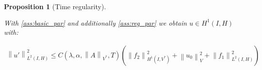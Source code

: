 \documentclass[english,a4paper,9pt,oneside]{scrbook}	%
\theoremstyle{break}
\newtheorem{thm}[equation]{Theorem}
\newtheorem{prop}[equation]{Proposition}
\newenvironment{mproof}[1][\proofname]{%
  \begin{proof}[#1]$ $\par\nobreak\ignorespaces
}{%
  \end{proof}
}
\renewcommand*{\proofname}{Proof}
\theoremstyle{remark}
\newcommand{\norm}[1]{\left\lVert#1\right\rVert}
\newcommand{\HN}[1]{\norm{#1}_{H}}
\newcommand{\VN}[1]{\norm{#1}_{V}}
\newcommand{\VSN}[1]{\norm{#1}_{V^*}}
\begin{document}
\begin{appendices}
%
%
%
%
%
%
%

\begin{prop}[Time regularity]
\label{thm:const_track}

With \cref{ass:basic_par} and  additionally \cref{ass:reg_par} we obtain $u \in H^1(I,H)$ with:

\begin{align*}
\norm{u'}^2_{L^2(I,H)}\leq  C(\lambda, \alpha, \VSN{A}, T)(\norm{f_2}_{H^1(I,V^*)}^2+\VN{u_{0}}^2+\norm{f_1}_{L^2(I,H)}^2)
\end{align*}


\end{prop}
\end{appendices}
\end{document}
